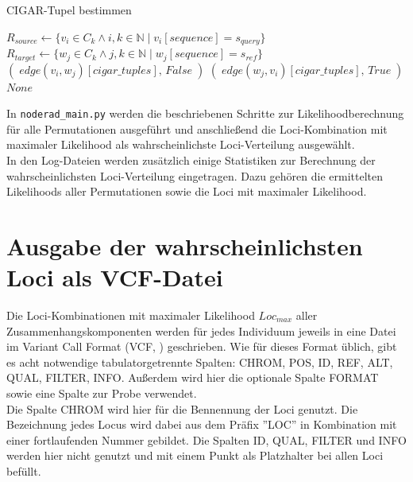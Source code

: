 \begin{algorithm}[H]
	\caption{CIGAR-Tupel bestimmen}  \label{alg:cig}
	\begin{algorithmic}[1]	
		\State $ R_{source} \gets \{v_{i} \in C_{k} \wedge i,k \in \mathds{N} \; |\; v_{i}[sequence]= s_{query} \}$
		\State $ R_{target} \gets \{w_{j} \in C_{k} \wedge j,k \in \mathds{N} \; |\; w_{j}[sequence]= s_{ref} \}$
		\State \Return $ (\;edge(v_{i}, w_{j})[cigar\_tuples],\, False\;) $		    
		\EndIf
		\State \Return $ (\;edge(w_{j}, v_{i})[cigar\_tuples],\, True\;) $		
		\EndIf
		\EndFor
		\EndFor
		\State \Return $ None $
		\EndFunction
	\end{algorithmic}
\end{algorithm}

In \lstinline|noderad_main.py| werden die beschriebenen Schritte zur Likelihoodberechnung für alle Permutationen ausgeführt und anschließend die Loci-Kombination mit maximaler Likelihood als wahrscheinlichste Loci-Verteilung ausgewählt.\\

In den Log-Dateien werden zusätzlich einige Statistiken zur Berechnung der wahrscheinlichsten Loci-Verteilung eingetragen. Dazu gehören die ermittelten Likelihoods aller Permutationen sowie die Loci mit maximaler Likelihood. \\

\section{Ausgabe der wahrscheinlichsten Loci als VCF-Datei} \label{sec:vcf}

Die Loci-Kombinationen mit maximaler Likelihood $Loc_{max}$ aller Zusammenhangskomponenten werden für jedes Individuum jeweils in eine Datei im Variant Call Format (VCF, \cite{danecek_2011}) geschrieben. Wie für dieses Format üblich, gibt es acht notwendige tabulatorgetrennte Spalten: CHROM, POS, ID, REF, ALT, QUAL, FILTER, INFO. Außerdem wird hier die optionale Spalte FORMAT sowie eine Spalte zur Probe verwendet. \\

Die Spalte CHROM wird hier für die Bennennung der Loci genutzt. Die Bezeichnung jedes Locus wird dabei aus dem Präfix ''LOC'' in Kombination mit einer fortlaufenden Nummer gebildet. Die Spalten ID, QUAL, FILTER und INFO werden hier nicht genutzt und mit einem Punkt als Platzhalter bei allen Loci befüllt.\\

